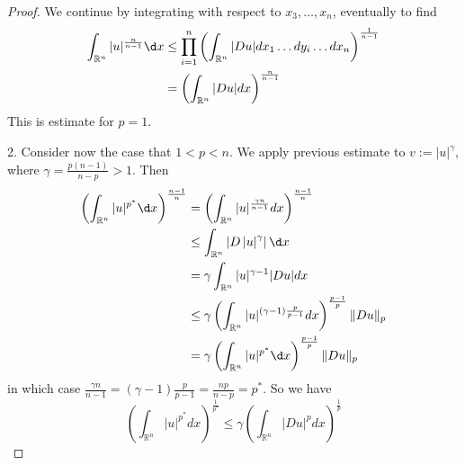 \begin{theorem}
\begin{proof}
        We continue by integrating with respect to $x_3, \ldots, x_n$, eventually to find
        \begin{equation*}
            \begin{aligned}
                \int_{\mathbb{R}^n}|u|^{\frac{n}{n-1}} \d  x &
                \leq \prod_{i=1}^n\left(\int_{\mathbb{R}^n}|D u| d x_1 \ldots d y_i \ldots d x_n\right)^{\frac{1}{n-1}}   \\
                                                             & =\left(\int_{\mathbb{R}^n}|D u| d x\right)^{\frac{n}{n-1}}
            \end{aligned}
        \end{equation*}
        This is estimate  for $p=1$.

        2. Consider now the case that $1<p<n$. We apply previous estimate to $v:=|u|^\gamma$, where $\gamma=\frac{p(n-1)}{n-p}>1$. Then
        \begin{equation*}
            \begin{aligned}
                \left(\int_{\mathbb{R}^n}|u|^{p^*} \d  x\right)^{\frac{n-1}{n}} &
                =\left(\int_{\mathbb{R}^n}|u|^{\frac{\gamma n}{n-1}} d x\right)^{\frac{n-1}{n}}                                                                                 \\
                                                                                & \leq \int_{\mathbb{R}^n} \left|D \left|u\right|^\gamma\right| \d x                            \\
                                                                                & =\gamma \int_{\mathbb{R}^n} |u|^{\gamma-1}|D u| d x                                           \\
                                                                                & \leq \gamma\left(\int_{\mathbb{R}^n}|u|^{(\gamma-1) \frac{p}{p-1}} d x\right)^{\frac{p-1}{p}}
                \|Du\|_p                                                                                                                                                        \\
                                                                                & = \gamma \left(\int_{\mathbb{R}^n}|u|^{p^*} \d  x\right)^{\frac{p-1}{p}} \|Du\|_p
            \end{aligned}
        \end{equation*}
        in which case $\frac{\gamma n}{n-1}=(\gamma-1) \frac{p}{p-1}=\frac{n p}{n-p}=p^*$. So we have
        \begin{equation*}
            \left(\int_{\mathbb{R}^n}|u|^{p^*} d x\right)^{\frac{1}{p^*}}
            \leq \gamma \left(\int_{\mathbb{R}^n}|D u|^p d x\right)^{\frac{1}{p}}
        \end{equation*}

    \end{proof}
\end{theorem}


